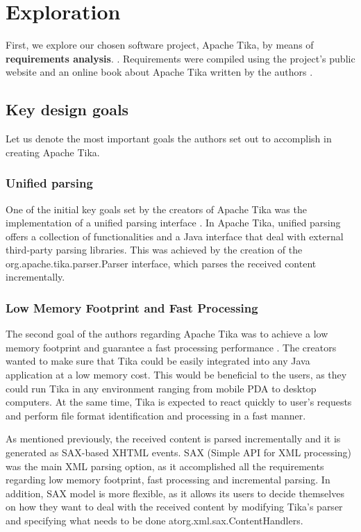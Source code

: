\documentclass{article}
\begin{document}
\section{Exploration}
First, we explore our chosen software project, Apache Tika, by means of \textbf{requirements analysis}. \citep{dresner1964maintenance}. Requirements were compiled using the project's public website \citep{apache_software_foundation_2020} and an online book about Apache Tika written by the authors \citep{tika_in_action}. 

\subsection{Key design goals}
Let us denote the most important goals the authors set out to accomplish in creating Apache Tika.
\subsubsection{Unified parsing}
One of the initial key goals set by the creators of Apache Tika was the implementation of a unified parsing interface \citep{tika_in_action}.  In Apache Tika, unified parsing offers a collection of functionalities and a Java interface that deal with external third-party parsing libraries. This was achieved by the creation of the org.apache.tika.parser.Parser interface, which parses the received content incrementally.

\subsubsection{Low Memory Footprint and Fast Processing}
The second goal of the authors regarding Apache Tika was to achieve a low memory footprint and guarantee a fast processing performance \citep{tika_in_action}. The creators wanted to make sure that Tika could be easily integrated into any Java application at a low memory cost. This would be beneficial to the users, as they could run Tika in any environment ranging from mobile PDA to desktop computers. At the same time, Tika is expected to react quickly to user’s requests and perform file format identification and processing in a fast manner.

As mentioned previously, the received content is parsed incrementally and it is generated as SAX-based XHTML events. SAX (Simple API for XML processing) was the main XML parsing option, as it accomplished all the requirements regarding low memory footprint, fast processing and incremental parsing. In addition, SAX model is more flexible, as it allows its users to decide themselves on how they want to deal with the received content by modifying Tika’s parser and specifying what needs to be done atorg.xml.sax.ContentHandlers.
\end{document}
